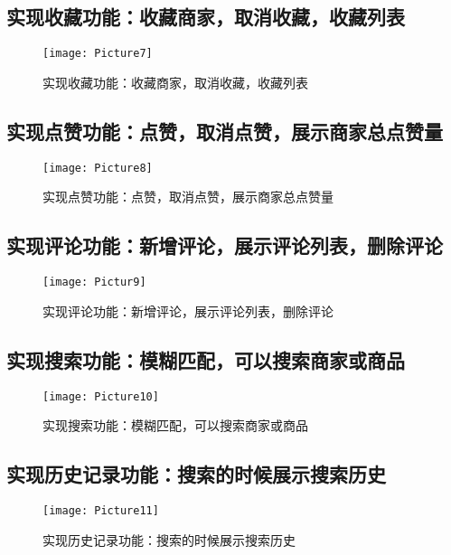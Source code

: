 \subsection{实现收藏功能：收藏商家，取消收藏，收藏列表}

\begin{figure}[H]
  \centering
  \texttt{[image: Picture7]}
  \caption{实现收藏功能：收藏商家，取消收藏，收藏列表}\label{fig:xml}
  \end{figure}

\subsection{实现点赞功能：点赞，取消点赞，展示商家总点赞量}

\begin{figure}[H]
  \centering
  \texttt{[image: Picture8]}
  \caption{实现点赞功能：点赞，取消点赞，展示商家总点赞量}\label{fig:xml}
  \end{figure}

\subsection{实现评论功能：新增评论，展示评论列表，删除评论}

\begin{figure}[H]
  \centering
  \texttt{[image: Pictur9]}
  \caption{实现评论功能：新增评论，展示评论列表，删除评论}\label{fig:xml}
  \end{figure}

\subsection{实现搜索功能：模糊匹配，可以搜索商家或商品}

\begin{figure}[H]
  \centering
  \texttt{[image: Picture10]}
  \caption{实现搜索功能：模糊匹配，可以搜索商家或商品}\label{fig:xml}
  \end{figure}

\subsection{实现历史记录功能：搜索的时候展示搜索历史}

\begin{figure}[H]
  \centering
  \texttt{[image: Picture11]}
  \caption{实现历史记录功能：搜索的时候展示搜索历史}\label{fig:xml}
  \end{figure}

